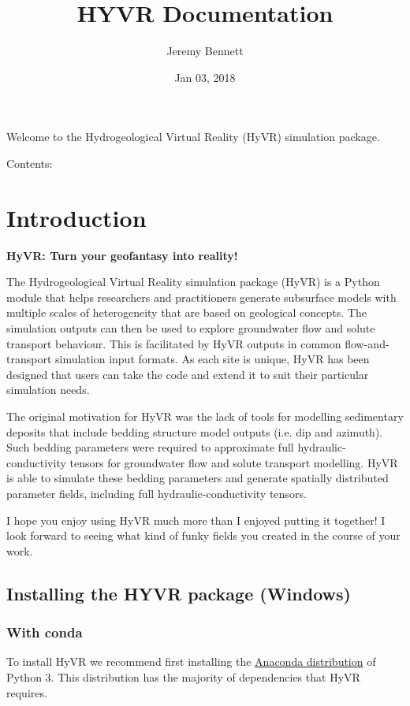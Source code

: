 \documentclass[letterpaper,10pt,english]{sphinxmanual}
\title{HYVR Documentation}
\date{Jan 03, 2018}
\author{Jeremy Bennett}
\begin{document}
\maketitle
\tableofcontents
{}\label{index::doc}


Welcome to the Hydrogeological Virtual Reality (HyVR) simulation package.

Contents:


\chapter{Introduction}
\label{intro::doc}\label{intro:the-hydrogeological-virtual-reality-hyvr-simulation-package}\label{intro:introduction}
\textbf{HyVR: Turn your geofantasy into reality!}

The Hydrogeological Virtual Reality simulation package (HyVR) is a Python module that helps researchers and practitioners generate subsurface models with multiple scales of heterogeneity that are based on geological concepts. The simulation outputs can then be used to explore groundwater flow and solute transport behaviour. This is facilitated by HyVR outputs in common flow-and-transport simulation input formats. As each site is unique, HyVR has been designed that users can take the code and extend it to suit their particular simulation needs.

The original motivation for HyVR was the lack of tools for modelling sedimentary deposits that include bedding structure model outputs (i.e. dip and azimuth). Such bedding parameters were required to approximate full hydraulic-conductivity tensors for groundwater flow and solute transport modelling. HyVR is able to simulate these bedding parameters and generate spatially distributed parameter fields, including full hydraulic-conductivity tensors.

I hope you enjoy using HyVR much more than I enjoyed putting it together! I look forward to seeing what kind of funky fields you created in the course of your work.


\section{Installing the HYVR package (Windows)}
\label{intro:installing-the-hyvr-package-windows}

\subsection{With conda}
\label{intro:with-conda}
To install HyVR we recommend first installing the \href{https://www.anaconda.com/download/}{Anaconda distribution} of Python 3. This distribution has the majority of dependencies that HyVR requires.
\end{document}
